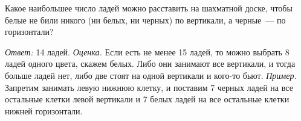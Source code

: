 Какое наибольшее число ладей можно расставить на шахматной доске, чтобы белые
не били никого (ни белых, ни черных) по вертикали, а черные~--- по горизонтали?

\solution
\emph{Ответ:} 14 ладей.
\emph{Оценка.}
Если есть не менее 15 ладей, то можно выбрать 8 ладей одного цвета, скажем
белых.
Либо они занимают все вертикали, и тогда больше ладей нет, либо две стоят на
одной вертикали и кого-то бьют.
\emph{Пример.}
Запретим занимать левую нижнюю клетку, и поставим 7 черных ладей на все
остальные клетки левой вертикали и 7 белых ладей на все остальные клетки нижней
горизонтали.

